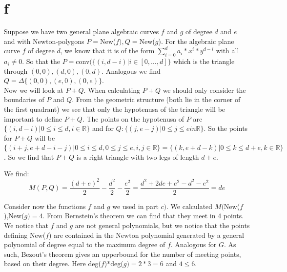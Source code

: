 \documentclass[paper=a4, fontsize=11pt]{scrartcl} %
\theoremstyle{plain}
\begin{document}
\section{f}
Suppose we have two general plane algebraic curves $f$ and $g$ of degree $d$ and $e$ and with Newton-polygons $P=$New($f), Q=$New($g$). For the algebraic plane curve $f$ of degree $d$, we know that it is of the form $\sum_{i=0}^{d}a_{i}*x^{i}*y^{d-i}$ with all $a_{i}\neq 0$. So that the $P=$conv$(\{(i,d-i)| i\in [0,\ldots,d]\}$ which is the triangle through $(0,0),(d,0),(0,d)$. Analogous we find $Q=\Delta\{(0,0),(e,0),(0,e)\}$.\\

Now we will look at $P+Q$. When calculating $P+Q$ we should only consider the boundaries of $P$ and $Q$. From the geometric structure (both lie in the corner of the first quadrant) we see that only the hypotenusa of the triangle will be important to define $P+Q$. The points on the hypotenusa of $P$ are $\{(i,d-i)| 0\leq i\leq d, i\in \mathbb{R}\}$ and for $Q: \{(j,e-j)| 0\leq j\leq e in \mathbb{R}\}$. So the points for $P+Q$ will be $\{(i+j,e+d-i-j) | 0\leq i\leq d, 0\leq j \leq e, i,j\in \mathbb{R}\} = \{(k,e+d-k) | 0\leq k\leq d+e, k\in \mathbb{R}\}$. So we find that $P+Q$ is a right triangle with two legs of length $d+e$. 

We find: 
\[M(P,Q)= \frac{(d+e)^{2}}{2} - \frac{d^{2}}{2} -\frac{e^{2}}{2}= \frac{d^{2} + 2de + e^{2}-d^{2}-e^{2}}{2}=de\]


Consider now the functions $f$ and $g$ we used in part $c)$. We calculated $M($New($f$),New($g)=4$. From Bernstein's theorem we can find that they meet in $4$ points. We notice that $f$ and $g$ are not general polynomials, but we notice that the points defining New($f$) are contained in the Newton polynomial generated by a general polynomial of degree equal to the maximum degree of $f$. Analogous for $G$. As such, Bezout's theorem gives an upperbound for the number of meeting points, based on their degree. Here deg($f$)*deg($g)=2*3=6$ and $4\leq 6$.
\end{document}

